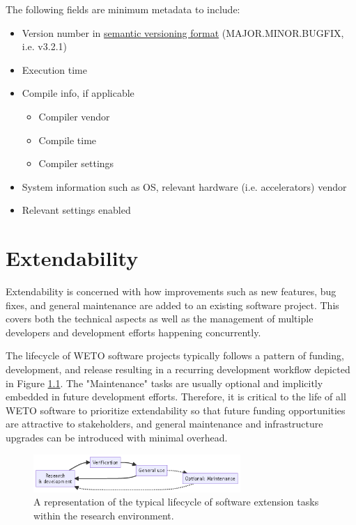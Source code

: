 \documentclass[]{nrel}
\begin{document}
The following fields are minimum metadata to include:
\begin{itemize}
\item Version number in \href{https://semver.org}{semantic versioning format} (MAJOR.MINOR.BUGFIX, i.e. v3.2.1)
\item Execution time

\item Compile info, if applicable
\begin{itemize}
\item Compiler vendor
\item Compile time
\item Compiler settings
\end{itemize}

\item System information such as OS, relevant hardware (i.e. accelerators) vendor
\item Relevant settings enabled

\end{itemize}


\chapter{Extendability}
\label{sec:extendability}
Extendability is concerned with how improvements such as new features, bug fixes, and general
maintenance are added to an existing software project. This covers both the technical aspects
as well as the management of multiple developers and development efforts happening
concurrently.

The lifecycle of WETO software projects typically follows a pattern of funding,
development, and release resulting in a recurring development workflow depicted in Figure \ref{fig:dev_lifecycle}.
The "Maintenance" tasks are usually optional and implicitly embedded
in future development efforts. Therefore, it is critical to the life of all WETO software to
prioritize extendability so that future funding opportunities are attractive to stakeholders,
and general maintenance and infrastructure upgrades can be introduced with minimal overhead.

\begin{figure}[htbp]
\begin{center}
\includegraphics[width=0.7\textwidth]{mermaid-d1bafe392e85b8f467e3d93074dc8d7b7c45dfd0.png}
\caption{A representation of the typical lifecycle of software extension tasks within the research environment.}
\label{fig:dev_lifecycle}
\end{center}
\end{figure}
\end{document}
